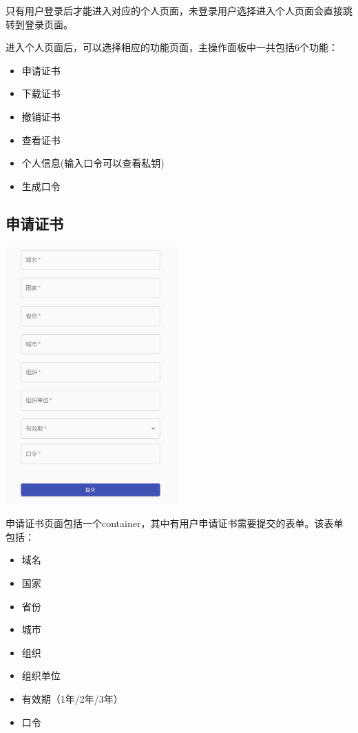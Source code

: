 \documentclass{ctexart}
\begin{document}
只有用户登录后才能进入对应的个人页面，未登录用户选择进入个人页面会直接跳转到登录页面。

进入个人页面后，可以选择相应的功能页面，主操作面板中一共包括6个功能：
\begin{itemize}
    \item 申请证书
    \item 下载证书
    \item 撤销证书
    \item 查看证书
    \item 个人信息(输入口令可以查看私钥)
    \item 生成口令
\end{itemize}



\subsection{申请证书}

\includegraphics[width=0.5\textwidth]{Clipboard_2021-01-01-11-38-18.png}

申请证书页面包括一个container，其中有用户申请证书需要提交的表单。该表单包括：
\begin{itemize}
    \item 域名
    \item 国家
    \item 省份
    \item 城市
    \item 组织
    \item 组织单位
    \item 有效期（1年/2年/3年）
    \item 口令
\end{itemize}
\end{document}
